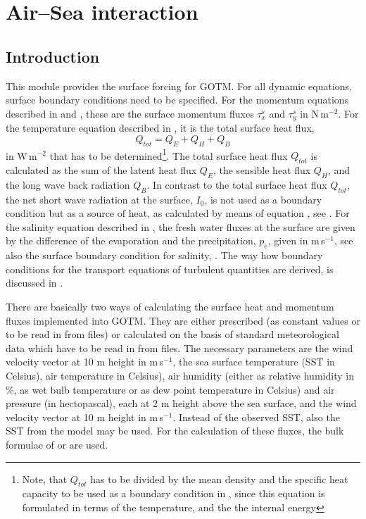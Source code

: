 %
%

\section{Air--Sea interaction \label{sec:airseaIntro}}

\subsection{Introduction}

This module provides the surface forcing for GOTM. For all dynamic
equations, surface boundary conditions need to be specified.  For the
momentum equations described in  and
, these are the surface momentum fluxes $\tau_x^s$ and
$\tau_y^s$ in N\,m$^{-2}$. For the temperature
equation described in , it is the total surface heat flux,
\begin{equation}
  Q_{tot}=Q_E+Q_H+Q_B
\end{equation}
in W\,m$^{-2}$ that has to be determined\footnote{Note, that $Q_{tot}$
has to be divided by the mean density and the specific heat capacity
to be used as a boundary condition in , since this equation is
formulated in terms of the temperature, and the the internal
energy}. The total surface heat flux $Q_{tot}$ is calculated as the
sum of the latent heat flux $Q_E$, the sensible heat flux $Q_H$, and
the long wave back radiation $Q_B$.  In contrast to the total surface
heat flux $Q_{tot}$, the net short wave radiation at the surface,
$I_0$, is not used as a boundary condition but as a source of heat, as
calculated by means of equation , see \cite{PaulsonSimpson77}.
For the salinity equation described in , the fresh
water fluxes at the surface are given by the difference 
of the evaporation and the 
precipitation, $p_e$, given in m\,s$^{-1}$, see also the surface boundary
condition for salinity, . 
The way how boundary conditions for the
transport equations of turbulent quantities are derived, is discussed
in .

There are basically two ways of calculating the surface heat and
momentum fluxes implemented into GOTM. They are either prescribed (as
constant values or to be read in from files) or calculated on the
basis of standard meteorological data which have to be read in from
files. The necessary parameters are 
the wind velocity vector at 10 m height in m\,s$^{-1}$,
the sea surface temperature (SST in Celsius), 
air temperature in Celsius), air humidity (either as relative humidity
in \%, as wet bulb temperature or as dew point
temperature in Celsius) and air pressure (in hectopascal), each at 2 m height
above the sea surface, and
the wind velocity vector at 10 m height in m\,s$^{-1}$. 
Instead of the observed SST,
also the SST from the model may be used.  For the calculation of these
fluxes, the bulk formulae of \cite{Kondo75} or \cite{Fairalletal96}
are used. 
